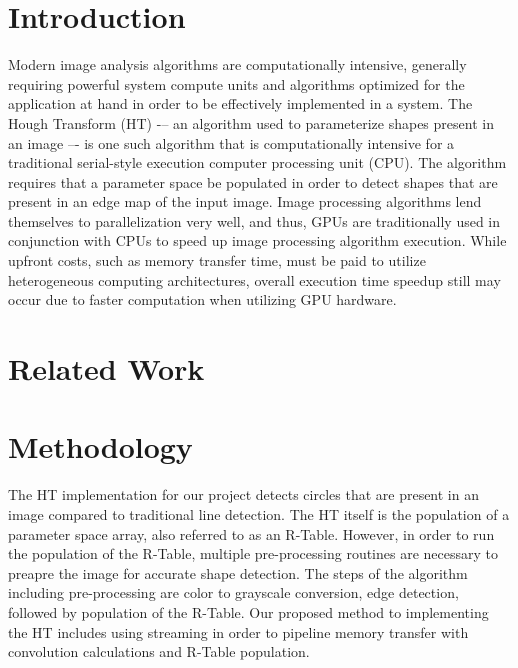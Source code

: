 \documentclass[conference]{IEEEtran}
\begin{document}
\section{Introduction}
Modern image analysis algorithms are computationally intensive, generally requiring powerful system compute units and algorithms optimized for the application at hand in order to be effectively implemented in a system. 
The Hough Transform (HT)\cite{BALLARD1981111} -– an algorithm used to parameterize shapes present in an image –- is one such algorithm that is computationally intensive for a traditional serial-style execution computer processing unit (CPU).
The algorithm requires that a parameter space be populated in order to detect shapes that are present in an edge map of the input image.
Image processing algorithms lend themselves to parallelization very well, and thus, GPUs are traditionally used in conjunction with CPUs to speed up image processing algorithm execution.
While upfront costs, such as memory transfer time, must be paid to utilize heterogeneous computing architectures, overall execution time speedup still may occur due to faster computation when utilizing GPU hardware.




\section{Related Work}


\section{Methodology}
The HT implementation for our project detects circles that are present in an image compared to traditional line detection.
The HT itself is the population of a parameter space array, also referred to as an R-Table.
However, in order to run the population of the R-Table, multiple pre-processing routines are necessary to preapre the image for accurate shape detection.
The steps of the algorithm including pre-processing are color to grayscale conversion, edge detection, followed by population of the R-Table.
Our proposed method to implementing the HT includes using streaming in order to pipeline memory transfer with convolution calculations and R-Table population.
\end{document}
